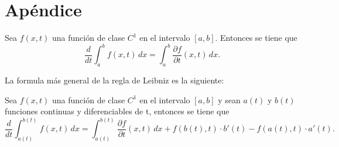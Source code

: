 \section{Apéndice}


\begin{teorema}
    Sea $f(x,t)$ una función de clase $C^1$ en el intervalo $[a,b]$. Entonces se tiene que
    \[
        \frac{d}{dt} \int_{a}^{b} f(x,t) \, dx = \int_{a}^{b} \frac{\partial f}{\partial t} (x,t) \, dx.
    \]
\end{teorema}

La formula más general de la regla de Leibniz es la siguiente:

\begin{teorema}
    Sea $f(x,t)$ una función de clase $C^1$ en el intervalo $[a,b]$ y sean $a(t)$ y $b(t)$ funciones continuas y diferenciables de t, entonces se tiene que
    \[
        \frac{d}{dt} \int_{a(t)}^{b(t)} f(x,t) \, dx = \int_{a(t)}^{b(t)} \frac{\partial f}{\partial t} (x,t) \, dx + f(b(t),t) \cdot b'(t) - f(a(t),t) \cdot a'(t).
    \]
\end{teorema}
